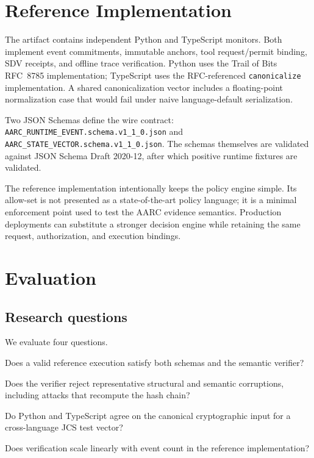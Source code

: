 \documentclass{article}
\begin{document}
\section{Reference Implementation}

The artifact contains independent Python and TypeScript monitors. Both
implement event commitments, immutable anchors, tool request/permit binding,
SDV receipts, and offline trace verification. Python uses the Trail of Bits
RFC~8785 implementation; TypeScript uses the RFC-referenced
\texttt{canonicalize} implementation. A shared canonicalization vector includes
a floating-point normalization case that would fail under naive language-default
serialization.

Two JSON Schemas define the wire contract:
\texttt{AARC\_RUNTIME\_EVENT.schema.v1\_1\_0.json} and
\texttt{AARC\_STATE\_VECTOR.schema.v1\_1\_0.json}. The schemas themselves are
validated against JSON Schema Draft 2020-12, after which positive runtime
fixtures are validated.

The reference implementation intentionally keeps the policy engine simple.
Its allow-set is not presented as a state-of-the-art policy language; it is a
minimal enforcement point used to test the AARC evidence semantics. Production
deployments can substitute a stronger decision engine while retaining the same
request, authorization, and execution bindings.

\section{Evaluation}

\subsection{Research questions}

We evaluate four questions.

\begin{description}[leftmargin=1.8cm,style=nextline]
  \item[RQ1] Does a valid reference execution satisfy both schemas and the
  semantic verifier?
  \item[RQ2] Does the verifier reject representative structural and semantic
  corruptions, including attacks that recompute the hash chain?
  \item[RQ3] Do Python and TypeScript agree on the canonical cryptographic input
  for a cross-language JCS test vector?
  \item[RQ4] Does verification scale linearly with event count in the reference
  implementation?
\end{description}
\end{document}
